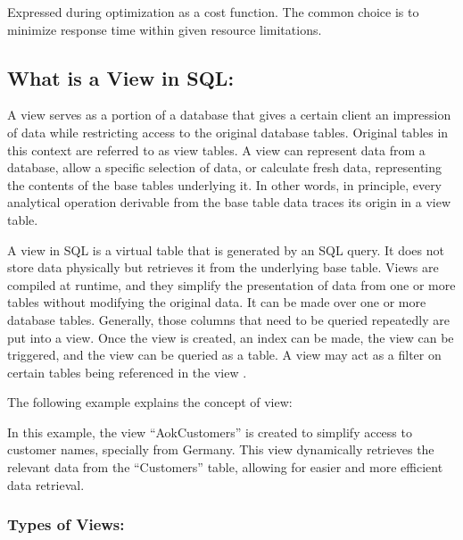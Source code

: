 Expressed during optimization as a cost function. The common choice is to minimize response time within given resource limitations.



\subsection{What is a View in SQL:}
A view serves as a portion of a database that gives a certain client an impression of data while restricting access to the original database tables. Original tables in this context are referred to as view tables. A view can represent data from a database, allow a specific selection of data, or calculate fresh data, representing the contents of the base tables underlying it. In other words, in principle, every analytical operation derivable from the base table data traces its origin in a view table.\vspace{.4cm}

A view in SQL is a virtual table that is generated by an SQL query. It does not store data physically but retrieves it from the underlying base table. Views are compiled at runtime, and they simplify the presentation of data from one or more tables without modifying the original data. It can be made over one or more database tables. Generally, those columns that need to be queried repeatedly are put into a view. Once the view is created, an index can be made, the view can be triggered, and the view can be queried as a table. A view may act as a filter on certain tables being referenced in the view \cite{chauhan-2024, Rohan_Vats-2024}.\vspace{.4cm}


The following example explains the concept of view:



 In this example, the view ``AokCustomers'' is created to simplify access to customer names, specially from Germany. This view dynamically retrieves the relevant data from the ``Customers'' table, allowing for easier and more efficient data retrieval.
 
\subsubsection{Types of Views:}

